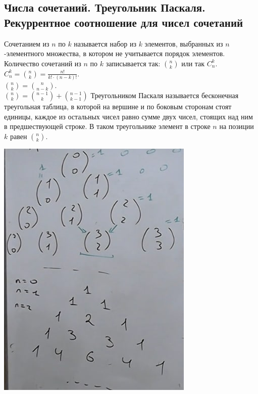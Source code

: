 \subsection{Числа сочетаний. Треугольник Паскаля. Рекуррентное соотношение для чисел сочетаний}

Сочетанием из $n$ по $k$ называется набор из $k$ элементов, выбранных из $n$-элементного множества, в котором не учитывается порядок элементов.
Количество сочетаний из $n$ по $k$ записывается так: $\binom{n}{k}$ или так $C^k_n$. $C^k_n =\binom{n}{k} = \frac{n!}{k!\cdot(n-k)!}$.\\ $\binom{n}{k} = \binom{n}{n-k}$.\\ $\binom{n}{k} = \binom{n-1}{k} + \binom{n-1}{k-1}$
Треугольником Паскаля называется бесконечная треугольная таблица, в которой на вершине и по боковым сторонам стоят единицы, каждое из остальных чисел равно сумме двух чисел, стоящих над ним в предшествующей строке. В таком треугольнике элемент в строке $n$ на позиции $k$ равен $\binom{n}{k}$.

\includegraphics[scale=1]{definitions/images/pascal.png}